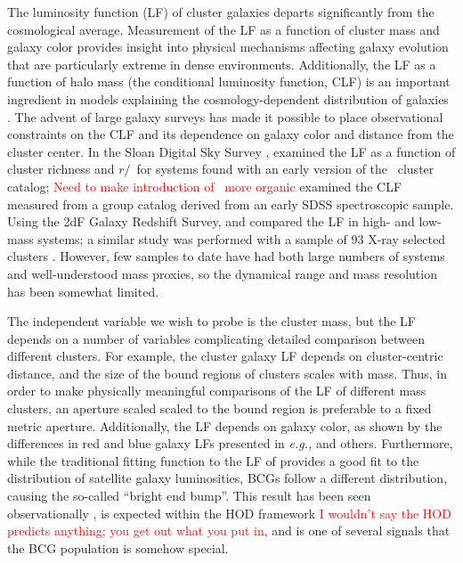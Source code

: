 \documentclass{emulateapj}
\begin{document}
The luminosity function (LF) of cluster galaxies departs significantly from the
cosmological average.  Measurement of the LF as a function of cluster mass and
galaxy color provides insight into physical mechanisms affecting galaxy
evolution that are particularly extreme in dense environments.  Additionally,
the LF as a function of halo mass (the conditional luminosity function, CLF) is
an important ingredient in models explaining the cosmology-dependent
distribution of galaxies \citep[see][and references therein]{vdB07}.  The
advent of large galaxy surveys has made it possible to place observational
constraints on the CLF and its dependence on galaxy color and distance from the
cluster center.  In the Sloan Digital Sky Survey \citep*[][SDSS]{York00},
\citet{Hansen05} examined the LF as a function of cluster richness and
$r/$\rtwo\ for systems found with an early version of the \maxbcg\ cluster
catalog; \textcolor{red}{Need to make introduction of \maxbcg\ more organic}
\citet{Weinmann06b} examined the CLF measured from a group catalog derived from
an early SDSS spectroscopic sample.  Using the 2dF Galaxy Redshift Survey,
\citet{depropris03} and \citet{Robotham06} compared the LF in high- and
low-mass systems; a similar study was performed with a sample of 93 X-ray
selected clusters \citet{LMS04}.  However, few samples to date have had both
large numbers of systems and well-understood mass proxies, so the dynamical
range and mass resolution has been somewhat limited.

The independent variable we wish to probe is the cluster mass, but the LF
depends on a number of variables complicating detailed comparison between
different clusters.  For example, the cluster galaxy LF depends on
cluster-centric distance, and the size of the bound regions of clusters scales
with mass.  Thus, in order to make physically meaningful comparisons of the LF
of different mass clusters, an aperture scaled scaled to the bound region is
preferable to a fixed metric aperture.  Additionally, the LF depends on galaxy
color, as shown by the differences in red and blue galaxy LFs presented in {\it
e.g.,} \citet{PopessoLF} and others.  Furthermore, while the traditional
fitting function to the LF of \citet{Schechter76} provides a good fit to the
distribution of satellite galaxy luminosities, BCGs follow a different
distribution, causing the so-called ``bright end bump''.  This result has been
seen observationally \citep[e.g.,][]{Hansen05}, is expected within the HOD
framework \citep[e.g.,][]{Kravtsov04,Zheng05} \textcolor{red}{I wouldn't say
the HOD predicts anything; you get out what you put in}, and is one of several
signals that the BCG population is somehow special.
\end{document}
